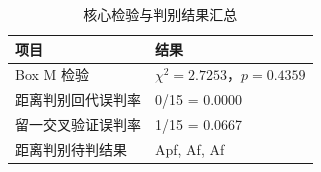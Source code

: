 \begin{table}[H]
    \centering
    \caption{核心检验与判别结果汇总}
    \label{tab:core_summary}
    \renewcommand{\arraystretch}{1.25}
    \begin{tabular}{lp{9.2cm}}
        \toprule
        项目 & 结果 \\
        \midrule
        Box M 检验 & $\chi^2=2.7253$，$p=0.4359$ \\
距离判别回代误判率 & 0/15 = 0.0000 \\
留一交叉验证误判率 & 1/15 = 0.0667 \\
距离判别待判结果 & Apf, Af, Af \\
        \bottomrule
    \end{tabular}
\end{table}
